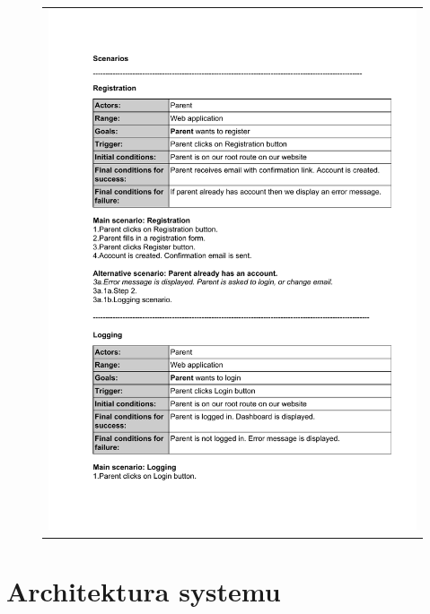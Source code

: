 \documentclass{sprawozdanie-agh}
\begin{document}
		\begin{figure}[H] 
			\centering
			\begin{tabular}{c}
				\includegraphics[page=6, width=.95\textwidth]{scenarios} 
			\end{tabular} 
		\end{figure}
		

	\section{Architektura systemu}
		
\end{document}
